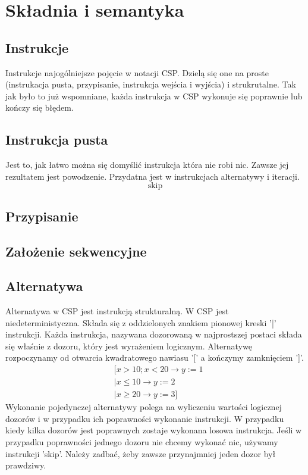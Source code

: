 \documentclass[a4paper]{report}
\begin{document}
  \chapter{Składnia i semantyka}

  \section{Instrukcje}
  Instrukcje najogólniejsze pojęcie w notacji CSP.
  Dzielą się one na proste (instrukacja pusta, przypisanie, instrukcja wejścia i wyjścia) i strukrutalne.
  Tak jak było to już wspomniane, każda instrukcja w CSP wykonuje się poprawnie lub kończy się błędem.

  \section{Instrukcja pusta}
  Jest to, jak łatwo można się domyślić instrukcja która nie robi nic.
  Zawsze jej rezultatem jest powodzenie.
  Przydatna jest w instrukcjach alternatywy i iteracji.
  \begin{equation}
    \text{skip}
  \end{equation}

  \section{Przypisanie}

  \section{Założenie sekwencyjne}

  \section{Alternatywa}
  Alternatywa w CSP jest instrukcją strukturalną.
  W CSP jest niedeterministyczna.
  Składa się z oddzielonych znakiem pionowej kreski '|' instrukcji.
  Każda instrukcja, nazywana dozorowaną w najprostszej postaci składa się właśnie z dozoru, który jest wyrażeniem logicznym.
  Alternatywę rozpoczynamy od otwarcia kwadratowego nawiasu '[' a kończymy zamknięciem ']'.
  \begin{equation}
    \begin{split}
      &\lbrack x > 10; x < 20 \rightarrow y := 1\\
      &|x \leq 10 \rightarrow y := 2\\
      &|x \geq 20 \rightarrow y := 3 \rbrack
    \end{split}
  \end{equation}
  Wykonanie pojedynczej alternatywy polega na wyliczeniu wartości logicznej dozorów i w przypadku ich poprawności wykonanie instrukcji.
  W przypadku kiedy kilka dozorów jest poprawnych zostaje wykonana losowa instrukcja.
  Jeśli w przypadku poprawności jednego dozoru nie chcemy wykonać nic, używamy instrukcji 'skip'.
  Należy zadbać, żeby zawsze przynajmniej jeden dozor był prawdziwy.
\end{document}
